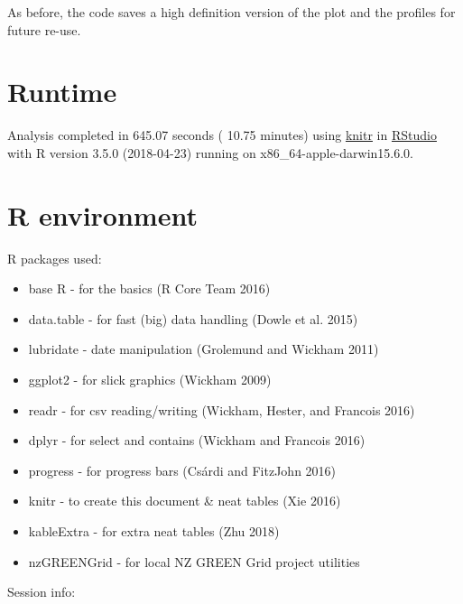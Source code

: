 \documentclass[]{article}
\providecommand{\tightlist}{%
  \setlength{\itemsep}{0pt}\setlength{\parskip}{0pt}}
\begin{document}
As before, the code saves a high definition version of the plot and the
profiles for future re-use.

\section{Runtime}\label{runtime}

Analysis completed in 645.07 seconds ( 10.75 minutes) using
\href{https://cran.r-project.org/package=knitr}{knitr} in
\href{http://www.rstudio.com}{RStudio} with R version 3.5.0 (2018-04-23)
running on x86\_64-apple-darwin15.6.0.

\section{R environment}\label{r-environment}

R packages used:

\begin{itemize}
\tightlist
\item
  base R - for the basics (R Core Team 2016)
\item
  data.table - for fast (big) data handling (Dowle et al. 2015)
\item
  lubridate - date manipulation (Grolemund and Wickham 2011)
\item
  ggplot2 - for slick graphics (Wickham 2009)
\item
  readr - for csv reading/writing (Wickham, Hester, and Francois 2016)
\item
  dplyr - for select and contains (Wickham and Francois 2016)
\item
  progress - for progress bars (Csárdi and FitzJohn 2016)
\item
  knitr - to create this document \& neat tables (Xie 2016)
\item
  kableExtra - for extra neat tables (Zhu 2018)
\item
  nzGREENGrid - for local NZ GREEN Grid project utilities
\end{itemize}

Session info:
\end{document}
